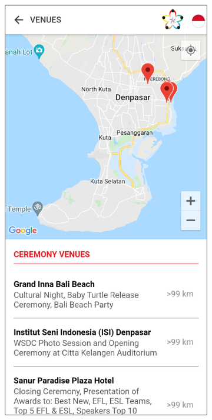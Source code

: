 \begin{figure}[H]
     \centering
     \begin{subfigure}[b]{0.3\textwidth}
         \centering
         \includegraphics[width=\textwidth]{Gambar/SSVenuesMap.png}

\end{subfigure}
\end{figure}
